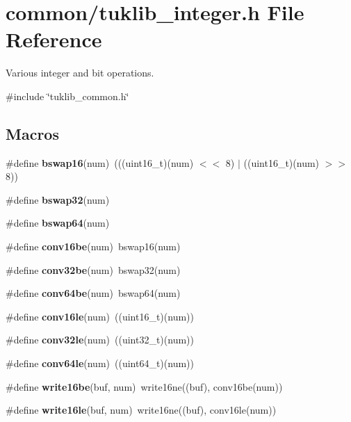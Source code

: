 \section{common/tuklib\+\_\+integer.h File Reference}
\label{tuklib__integer_8h}


Various integer and bit operations.  


{\ttfamily \#include \char`\"{}tuklib\+\_\+common.\+h\char`\"{}}\newline
\subsection*{Macros}
\begin{DoxyCompactItemize}
\item 
\mbox{\label{tuklib__integer_8h_a9bc188ccb2085aca13b9e411db6bae11}} 
\#define {\bfseries bswap16}(num)~(((uint16\+\_\+t)(num) $<$$<$ 8) $\vert$ ((uint16\+\_\+t)(num) $>$$>$ 8))
\item 
\#define {\bfseries bswap32}(num)
\item 
\#define {\bfseries bswap64}(num)
\item 
\mbox{\label{tuklib__integer_8h_a6b2b9d836ddb7dc5d299ead15101f57a}} 
\#define {\bfseries conv16be}(num)~bswap16(num)
\item 
\mbox{\label{tuklib__integer_8h_a812ae5d9be2d45d34f37744eb35c6ec4}} 
\#define {\bfseries conv32be}(num)~bswap32(num)
\item 
\mbox{\label{tuklib__integer_8h_a8ed018b58daffeb1bb83871cf4e09f2d}} 
\#define {\bfseries conv64be}(num)~bswap64(num)
\item 
\mbox{\label{tuklib__integer_8h_a3f517ab0a93d921fd78a2d0647ab906f}} 
\#define {\bfseries conv16le}(num)~((uint16\+\_\+t)(num))
\item 
\mbox{\label{tuklib__integer_8h_aaa18c21f5b341ddb6952b6b798be9795}} 
\#define {\bfseries conv32le}(num)~((uint32\+\_\+t)(num))
\item 
\mbox{\label{tuklib__integer_8h_a2cb6884e43cdd40bf5c5e67bebec7b27}} 
\#define {\bfseries conv64le}(num)~((uint64\+\_\+t)(num))
\item 
\mbox{\label{tuklib__integer_8h_a1f3fa212057250e94c915987ee6c3d0b}} 
\#define {\bfseries write16be}(buf,  num)~write16ne((buf), conv16be(num))
\item 
\mbox{\label{tuklib__integer_8h_af0b9424360d88d83fe8161d5e210b4b2}} 
\#define {\bfseries write16le}(buf,  num)~write16ne((buf), conv16le(num))
\item 

\end{DoxyCompactItemize}
